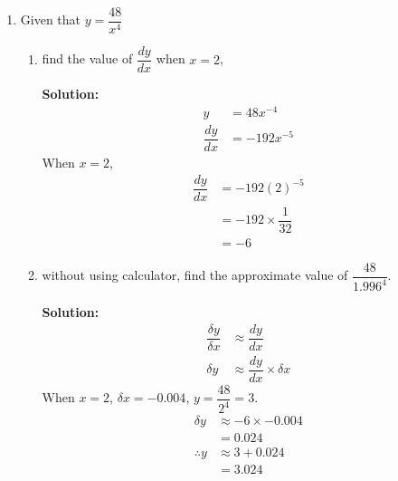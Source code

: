 \documentclass{report}
\newcommand{\sol}{\textbf{Solution:}}
\begin{document}
\begin{enumerate}[leftmargin=*]
\begin{enumerate}
              \item Vectors $\vec{p}$ and $\vec{q}$ are parallel vectors. It is given that $|3 a-b|
                        \vec{p}=4 \vec{q}$, where $a$ and $b$ are constants. Express $a$ in terms of
                    $b$.

                    \sol{}

                    Skipped cuz very sus.
          \end{enumerate}

          \newpage
    \item Given that $y=\dfrac{48}{x^4}$
          \begin{enumerate}
              \item find the value of $\dfrac{d y}{d x}$ when $x=2$,

                    \sol{}
                    \begin{align*}
                        y                & = 48x^{-4}   \\
                        \dfrac{d y}{d x} & = -192x^{-5}
                    \end{align*}
                    When $x = 2$,
                    \begin{align*}
                        \dfrac{d y}{d x} & = -192(2)^{-5}              \\
                                         & = -192 \times \dfrac{1}{32} \\
                                         & = -6
                    \end{align*}

              \item without using calculator, find the approximate value of $\dfrac{48}{1.996^4}$.

                    \sol{}
                    \begin{align*}
                        \dfrac{\delta y}{\delta x} & \approx \dfrac{dy}{dx}                 \\
                        \delta y                   & \approx \dfrac{dy}{dx} \times \delta x
                    \end{align*}
                    When $x = 2$, $\delta x = -0.004$, $y = \dfrac{48}{2^4} = 3$.
                    \begin{align*}
                        \delta y     & \approx -6 \times -0.004 \\
                                     & = 0.024                  \\
                        \therefore y & \approx 3 + 0.024        \\
                                     & = 3.024
                    \end{align*}
          \end{enumerate}


\end{enumerate}
\end{document}
